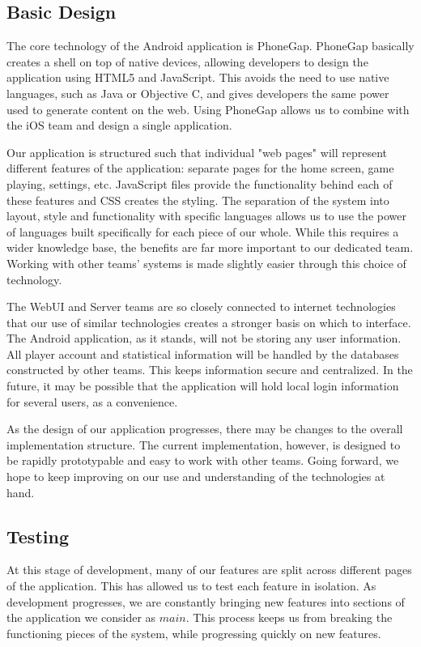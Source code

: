 \documentclass[12pt]{article}
\begin{document}
\subsection{Basic Design}
The core technology of the Android application is PhoneGap\cite{PhoneGap-About}.  PhoneGap basically creates a shell on top of native devices, allowing developers to design the application using HTML5 and JavaScript.  This avoids the need to use native languages, such as Java or Objective C, and gives developers the same power used to generate content on the web.  Using PhoneGap allows us to combine with the iOS team and design a single application.  

Our application is structured such that individual "web pages" will represent different features of the application: separate pages for the home screen, game playing, settings, etc.  JavaScript files provide the functionality behind each of these features and CSS creates the styling.  The separation of the system into layout, style and functionality with specific languages allows us to use the power of languages built specifically for each piece of our whole.  While this requires a wider knowledge base, the benefits are far more important to our dedicated team.  Working with other teams' systems is made slightly easier through this choice of technology.

The WebUI and Server teams are so closely connected to internet technologies that our use of similar technologies creates a stronger basis on which to interface.  The Android application, as it stands, will not be storing any user information.  All player account and statistical information will be handled by the databases constructed by other teams.  This keeps information secure and centralized.  In the future, it may be possible that the application will hold local login information for several users, as a convenience.  

As the design of our application progresses, there may be changes to the overall implementation structure.  The current implementation, however, is designed to be rapidly prototypable and easy to work with other teams.  Going forward, we hope to keep improving on our use and understanding of the technologies at hand.


\subsection{Testing}
At this stage of development, many of our features are split across different pages of the application.  This has allowed us to test each feature in isolation.  As development progresses, we are constantly bringing new features into sections of the application we consider as $main$.  This process keeps us from breaking the functioning pieces of the system, while progressing quickly on new features.
\end{document}
